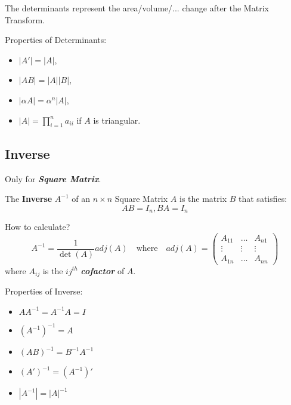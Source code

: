 \begin{remark*}
    The determinants represent the area/volume/... change after the Matrix Transform.
\end{remark*}

Properties of Determinants:
\begin{itemize}
    \item $|A'| = |A|$,
    \item $|AB| = |A||B|$,
    \item $|\alpha A| = \alpha ^{n}|A|$,
    \item $|A| = \prod_{i=1}^{n} a_{ii}$ if $A$ is triangular.
\end{itemize}

\subsection{Inverse}
\begin{remark*}
    Only for \textbf{\textit{Square Matrix}}.
\end{remark*}

\begin{definition}
    The \textbf{Inverse} $A ^{-1}$ of an $n \times n$ Square Matrix $A$ is the matrix $B$ that satisfies:
    \begin{equation*}
        AB=I_{n}, BA=I_{n}
    \end{equation*}
\end{definition}

How to calculate?
\begin{equation*}
    A^{-1} = \frac{1}{\det(A)}adj(A) \quad \text{where} \quad adj(A) = \begin{pmatrix}
        A_{11} & \dots  & A_{n1} \\
        \vdots & \vdots & \vdots \\
        A_{1n} & \dots  & A_{nn}
    \end{pmatrix}
\end{equation*}
where $A_{ij}$ is the $ij ^{th}$ \textit{\textbf{cofactor}} of $A$.

Properties of Inverse:
\begin{itemize}
    \item $AA^{-1} = A^{-1} A = I$
    \item $(A^{-1})^{-1} = A$
    \item $(AB)^{-1} = B^{-1}A^{-1}$
    \item $(A')^{-1} = (A^{-1})'$
    \item $|A^{-1}| = |A|^{-1}$
\end{itemize}

